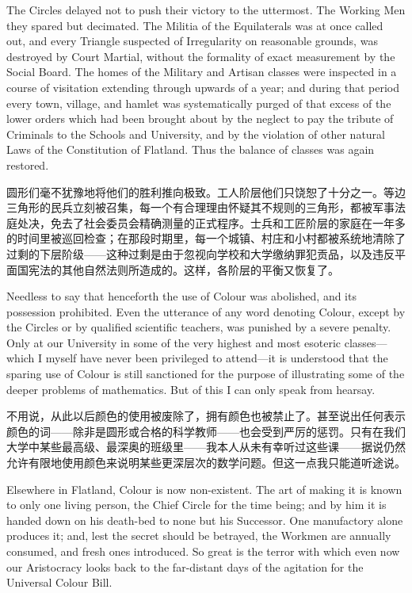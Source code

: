 \documentclass[12pt,UTF8]{ctexbook}
\begin{document}
The Circles delayed not to push their victory to the uttermost. The Working Men they spared but decimated. The Militia of the Equilaterals was at once called out, and every Triangle suspected of Irregularity on reasonable grounds, was destroyed by Court Martial, without the formality of exact measurement by the Social Board. The homes of the Military and Artisan classes were inspected in a course of visitation extending through upwards of a year; and during that period every town, village, and hamlet was systematically purged of that excess of the lower orders which had been brought about by the neglect to pay the tribute of Criminals to the Schools and University, and by the violation of other natural Laws of the Constitution of Flatland. Thus the balance of classes was again restored.

圆形们毫不犹豫地将他们的胜利推向极致。工人阶层他们只饶恕了十分之一。等边三角形的民兵立刻被召集，每一个有合理理由怀疑其不规则的三角形，都被军事法庭处决，免去了社会委员会精确测量的正式程序。士兵和工匠阶层的家庭在一年多的时间里被巡回检查；在那段时期里，每一个城镇、村庄和小村都被系统地清除了过剩的下层阶级——这种过剩是由于忽视向学校和大学缴纳罪犯贡品，以及违反平面国宪法的其他自然法则所造成的。这样，各阶层的平衡又恢复了。

Needless to say that henceforth the use of Colour was abolished, and its possession prohibited. Even the utterance of any word denoting Colour, except by the Circles or by qualified scientific teachers, was punished by a severe penalty. Only at our University in some of the very highest and most esoteric classes---which I myself have never been privileged to attend---it is understood that the sparing use of Colour is still sanctioned for the purpose of illustrating some of the deeper problems of mathematics. But of this I can only speak from hearsay.

不用说，从此以后颜色的使用被废除了，拥有颜色也被禁止了。甚至说出任何表示颜色的词——除非是圆形或合格的科学教师——也会受到严厉的惩罚。只有在我们大学中某些最高级、最深奥的班级里——我本人从未有幸听过这些课——据说仍然允许有限地使用颜色来说明某些更深层次的数学问题。但这一点我只能道听途说。

Elsewhere in Flatland, Colour is now non-existent. The art of making it is known to only one living person, the Chief Circle for the time being; and by him it is handed down on his death-bed to none but his Successor. One manufactory alone produces it; and, lest the secret should be betrayed, the Workmen are annually consumed, and fresh ones introduced. So great is the terror with which even now our Aristocracy looks back to the far-distant days of the agitation for the Universal Colour Bill.
\end{document}
